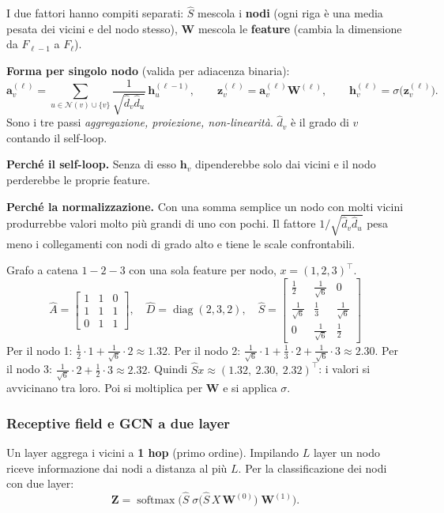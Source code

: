 \documentclass[11pt,a4paper]{article}
\begin{document}
I due fattori hanno compiti separati: $\hat{S}$ mescola i \textbf{nodi}
(ogni riga è una media pesata dei vicini e del nodo stesso), $\mathbf{W}$ mescola
le \textbf{feature} (cambia la dimensione da $F_{\ell-1}$ a $F_\ell$).
 
\textbf{Forma per singolo nodo} (valida per adiacenza binaria):
\[
\mathbf{a}_v^{(\ell)}=\sum_{u\in\mathcal{N}(v)\cup\{v\}}\frac{1}{\sqrt{\hat d_v\hat d_u}}\,\mathbf{h}_u^{(\ell-1)},
\qquad
\mathbf{z}_v^{(\ell)}=\mathbf{a}_v^{(\ell)}\mathbf{W}^{(\ell)},
\qquad
\mathbf{h}_v^{(\ell)}=\sigma\big(\mathbf{z}_v^{(\ell)}\big).
\]
Sono i tre passi \emph{aggregazione, proiezione, non-linearità}. $\hat d_v$ è il
grado di $v$ contando il self-loop.
 
\textbf{Perché il self-loop.} Senza di esso $\mathbf{h}_v$ dipenderebbe solo dai
vicini e il nodo perderebbe le proprie feature.
 
\textbf{Perché la normalizzazione.} Con una somma semplice un nodo con molti
vicini produrrebbe valori molto più grandi di uno con pochi. Il fattore
$1/\sqrt{\hat d_v\hat d_u}$ pesa meno i collegamenti con nodi di grado alto e
tiene le scale confrontabili.
 
\begin{osservazione}
Grafo a catena $1-2-3$ con una sola feature per nodo, $x=(1,2,3)^\top$.
\[
\hat{A}=\begin{bmatrix}1&1&0\\1&1&1\\0&1&1\end{bmatrix},\quad
\hat{D}=\operatorname{diag}(2,3,2),\quad
\hat{S}=\begin{bmatrix}\tfrac12&\tfrac1{\sqrt6}&0\\[2pt]\tfrac1{\sqrt6}&\tfrac13&\tfrac1{\sqrt6}\\[2pt]0&\tfrac1{\sqrt6}&\tfrac12\end{bmatrix}
\]
Per il nodo 1: $\tfrac12\cdot1+\tfrac1{\sqrt6}\cdot2\approx1.32$.
Per il nodo 2: $\tfrac1{\sqrt6}\cdot1+\tfrac13\cdot2+\tfrac1{\sqrt6}\cdot3\approx2.30$.
Per il nodo 3: $\tfrac1{\sqrt6}\cdot2+\tfrac12\cdot3\approx2.32$.
Quindi $\hat{S}x\approx(1.32,\ 2.30,\ 2.32)^\top$: i valori si avvicinano tra loro.
Poi si moltiplica per $\mathbf{W}$ e si applica $\sigma$.
\end{osservazione}
 
\subsubsection{Receptive field e GCN a due layer}
Un layer aggrega i vicini a \textbf{1 hop} (primo ordine). Impilando $L$ layer
un nodo riceve informazione dai nodi a distanza al più $L$. Per la
classificazione dei nodi con due layer:
\[
\mathbf{Z}=\operatorname{softmax}\!\Big(\hat{S}\;\sigma\big(\hat{S}\,X\,\mathbf{W}^{(0)}\big)\;\mathbf{W}^{(1)}\Big).
\]
 
\end{document}
